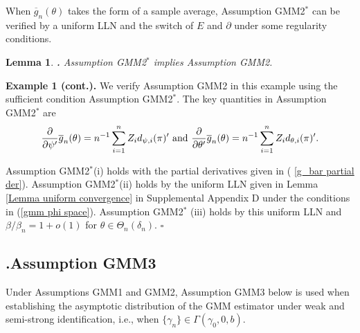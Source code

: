 \documentclass[12pt,thmsb,titlepage,final,oneside,letterpaper]{article}
\newtheorem{lemma}{Lemma}[section]
\begin{document}
When $\overline{g}_{n}(\theta )$ takes the form of a sample average,
Assumption GMM2$^{\ast }$ can be verified by a uniform LLN and the switch of 
$E$ and $\partial $ under some regularity conditions.\medskip

\begin{lemma}
\hspace{-0.08in}\textbf{.} \label{Lemma GMM Smooth Sufficient}Assumption 
\emph{GMM2}$^{\ast }$ implies Assumption \emph{GMM2.}
\end{lemma}

\noindent \textbf{Example 1 (cont.). }We verify Assumption GMM2 in this
example using the sufficient condition Assumption GMM2$^{\ast }.$ The key
quantities in Assumption GMM2$^{\ast }$ are%
\begin{equation}
\frac{\partial }{\partial \psi ^{\prime }}\overline{g}_{n}(\theta
)=n^{-1}\sum_{i=1}^{n}Z_{i}d_{\psi ,i}(\pi )^{\prime }\text{ and }\frac{%
\partial }{\partial \theta ^{\prime }}\overline{g}_{n}(\theta
)=n^{-1}\sum_{i=1}^{n}Z_{i}d_{\theta ,i}(\pi )^{\prime }.
\label{g_bar  partial der}
\end{equation}

Assumption GMM2$^{\ast }$(i) holds with the partial derivatives given in (%
\ref{g_bar partial der}). Assumption GMM2$^{\ast }$(ii) holds by the uniform
LLN given in Lemma \ref{Lemma uniform convergence} in Supplemental Appendix
D under the conditions in (\ref{gmm phi space}). Assumption GMM2$^{\ast }$%
(iii) holds by this uniform LLN and $\beta /\beta _{n}=1+o(1)$ for $\theta
\in \Theta _{n}(\delta _{n}).$ $\square $

\subsection{\hspace{-0.23in}\textbf{.}\hspace{0.18in}Assumption GMM3}

\hspace{0.25in}Under Assumptions GMM1 and GMM2, Assumption GMM3 below is
used when establishing the asymptotic distribution of the GMM estimator
under weak and semi-strong identification, i.e., when $\{\gamma _{n}\}\in
\Gamma (\gamma _{0},0,b).$
\end{document}
